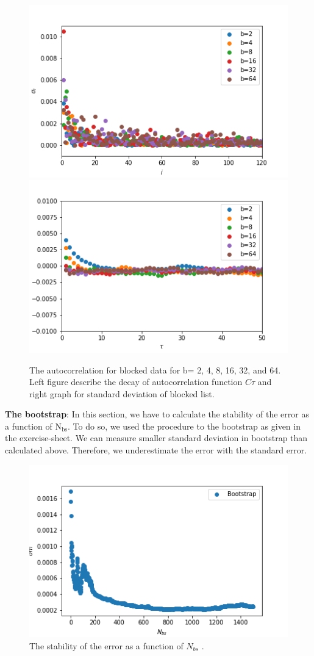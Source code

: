 \documentclass[11pt, a4paper, DIV=12]{scrartcl}
\begin{document}
	\begin{figure}[H]
		\centering
		\includegraphics[width=0.6\linewidth]{blocking_standard_deviation.png}\includegraphics[width=0.6\linewidth]{blocking_autokorrelation.png}
		\caption{ The autocorrelation for blocked data for b= 2, 4, 8, 16, 32, and 64. Left figure describe the decay of autocorrelation function $ C\tau $ and right graph for standard deviation of blocked list.}
		\label{fig:blockingAutocorrelation}
	\end{figure}
	
\textbf{The bootstrap}: In this section, we have to calculate the stability of the error as a function of $ \text{N}_{\text{bs}} $. To do so, we used the procedure to the bootstrap as given in the exercise-sheet. We can measure smaller standard deviation in bootstrap than calculated above. Therefore, we underestimate the error with the standard error.
	
	\begin{figure}[H]
		\centering
		\includegraphics[width=0.6\linewidth]{bootstrap.png}
		\caption{ The stability of the error as a function of $ N_{bs} $ .}
		\label{fig:boottrap}
	\end{figure}
\end{document}
